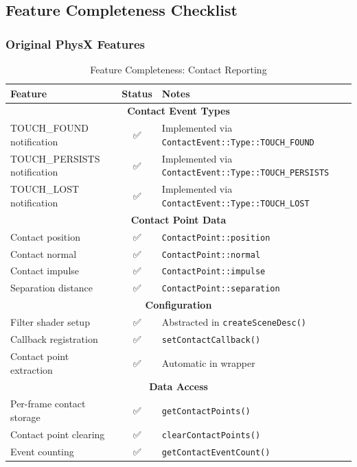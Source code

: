 \subsection{Feature Completeness Checklist}

\subsubsection{Original PhysX Features}

\begin{table}[h]
\centering
\begin{tabular}{|l|c|p{6cm}|}
\hline
\textbf{Feature} & \textbf{Status} & \textbf{Notes} \\
\hline
\multicolumn{3}{|c|}{\textbf{Contact Event Types}} \\
\hline
TOUCH\_FOUND notification & ✅ & Implemented via \texttt{ContactEvent::Type::TOUCH\_FOUND} \\
\hline
TOUCH\_PERSISTS notification & ✅ & Implemented via \texttt{ContactEvent::Type::TOUCH\_PERSISTS} \\
\hline
TOUCH\_LOST notification & ✅ & Implemented via \texttt{ContactEvent::Type::TOUCH\_LOST} \\
\hline
\multicolumn{3}{|c|}{\textbf{Contact Point Data}} \\
\hline
Contact position & ✅ & \texttt{ContactPoint::position} \\
\hline
Contact normal & ✅ & \texttt{ContactPoint::normal} \\
\hline
Contact impulse & ✅ & \texttt{ContactPoint::impulse} \\
\hline
Separation distance & ✅ & \texttt{ContactPoint::separation} \\
\hline
\multicolumn{3}{|c|}{\textbf{Configuration}} \\
\hline
Filter shader setup & ✅ & Abstracted in \texttt{createSceneDesc()} \\
\hline
Callback registration & ✅ & \texttt{setContactCallback()} \\
\hline
Contact point extraction & ✅ & Automatic in wrapper \\
\hline
\multicolumn{3}{|c|}{\textbf{Data Access}} \\
\hline
Per-frame contact storage & ✅ & \texttt{getContactPoints()} \\
\hline
Contact point clearing & ✅ & \texttt{clearContactPoints()} \\
\hline
Event counting & ✅ & \texttt{getContactEventCount()} \\
\hline
\end{tabular}
\caption{Feature Completeness: Contact Reporting}
\end{table}

